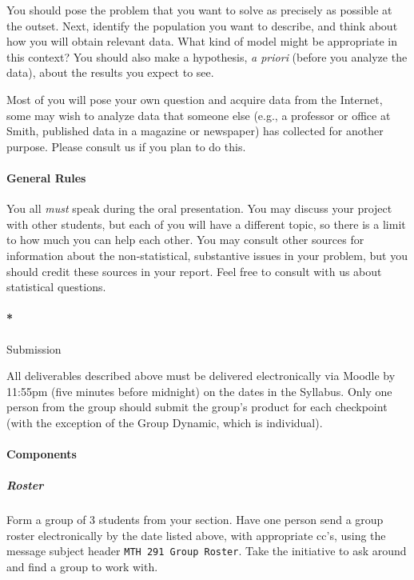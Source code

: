 \documentclass[]{article}
\let\oldparagraph\paragraph
\renewcommand{\paragraph}[1]{\oldparagraph{#1}\mbox{}}
\let\oldsubparagraph\subparagraph
\renewcommand{\subparagraph}[1]{\oldsubparagraph{#1}\mbox{}}
\begin{document}
You should pose the problem that you want to solve as precisely as
possible at the outset. Next, identify the population you want to
describe, and think about how you will obtain relevant data. What kind
of model might be appropriate in this context? You should also make a
hypothesis, \emph{a priori} (before you analyze the data), about the
results you expect to see.

Most of you will pose your own question and acquire data from the
Internet, some may wish to analyze data that someone else (e.g., a
professor or office at Smith, published data in a magazine or newspaper)
has collected for another purpose. Please consult us if you plan to do
this.

\paragraph{General Rules}\label{general-rules}

You all \emph{must} speak during the oral presentation. You may discuss
your project with other students, but each of you will have a different
topic, so there is a limit to how much you can help each other. You may
consult other sources for information about the non-statistical,
substantive issues in your problem, but you should credit these sources
in your report. Feel free to consult with us about statistical
questions.

\paragraph*{Submission}\label{submission}

All deliverables described above must be delivered electronically via
Moodle by 11:55pm (five minutes before midnight) on the dates in the
Syllabus. Only one person from the group should submit the group's
product for each checkpoint (with the exception of the Group Dynamic,
which is individual).

\paragraph{Components}\label{components}

\subparagraph{Roster}\label{roster}

Form a group of 3 students from your section. Have one person send a
group roster electronically by the date listed above, with appropriate
cc's, using the message subject header \texttt{MTH\ 291\ Group\ Roster}.
Take the initiative to ask around and find a group to work with.
\end{document}
